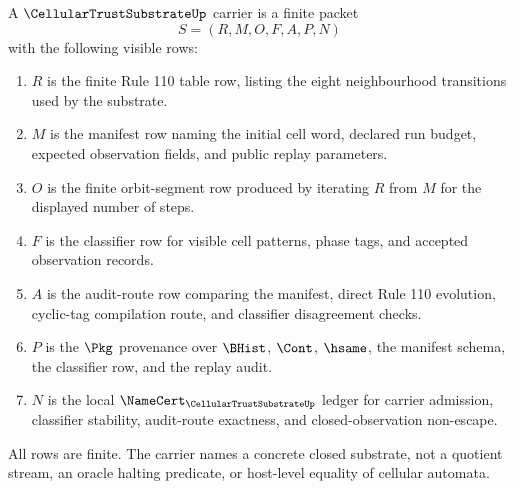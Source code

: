 \begin{definition}
\label{def:cellular-trust-substrate-namecert-carrier}
A $\CellularTrustSubstrateUp$ carrier is a finite packet
$$
S=(R,M,O,F,A,P,N)
$$
with the following visible rows:
\begin{enumerate}
\item $R$ is the finite Rule 110 table row, listing the eight neighbourhood transitions used by the substrate.
\item $M$ is the manifest row naming the initial cell word, declared run budget, expected observation fields, and public replay parameters.
\item $O$ is the finite orbit-segment row produced by iterating $R$ from $M$ for the displayed number of steps.
\item $F$ is the classifier row for visible cell patterns, phase tags, and accepted observation records.
\item $A$ is the audit-route row comparing the manifest, direct Rule 110 evolution, cyclic-tag compilation route, and classifier disagreement checks.
\item $P$ is the $\Pkg$ provenance over $\BHist$, $\Cont$, $\hsame$, the manifest schema, the classifier row, and the replay audit.
\item $N$ is the local $\NameCert_{\CellularTrustSubstrateUp}$ ledger for carrier admission, classifier stability, audit-route exactness, and closed-observation non-escape.
\end{enumerate}
All rows are finite. The carrier names a concrete closed substrate, not a quotient stream, an oracle halting predicate, or host-level equality of cellular automata.
\end{definition}

